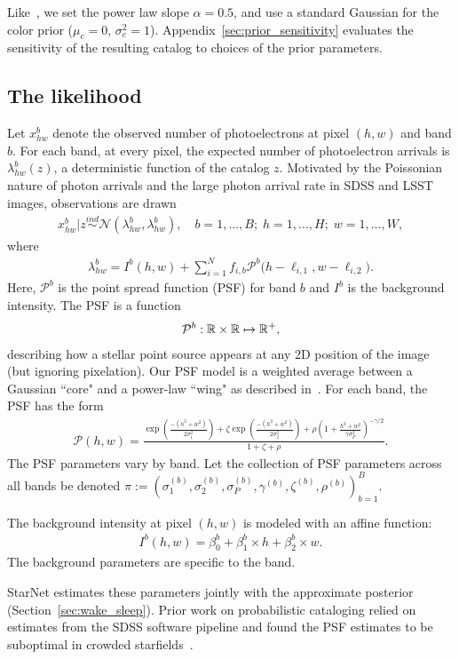 Like~\cite{Feder_2019}, we set the power law slope $\alpha = 0.5$, and use a standard Gaussian for the color prior ($\mu_c = 0$, $\sigma^2_c = 1$). 
Appendix~\ref{sec:prior_sensitivity} evaluates the 
sensitivity of the resulting catalog to choices of the prior parameters. 

\subsection{The likelihood}
Let $x_{hw}^b$ denote the observed number of photoelectrons at pixel $(h,w)$ and band $b$. For each band, at every pixel, the expected number of photoelectron arrivals is $\lambda^b_{hw}(z)$, a deterministic function of the catalog $z$. Motivated by the Poissonian nature of photon arrivals and 
the large photon arrival rate in SDSS and LSST images, 
observations are drawn
\begin{align}
  x_{hw}^b | z \overset{ind}{\sim} \mathcal{N}(\lambda^b_{hw}, \lambda^b_{hw}),
  \quad 
  b = 1, ..., B; \;
  h = 1,..., H; \; 
  w = 1, ..., W, 
\end{align}
where 
\begin{align}
  \lambda^b_{hw} = I^{b}(h, w) + \sum_{i = 1}^N f_{i,b} \mathcal{P}^b\big(h - \ell_{i, 1}, w - \ell_{i, 2}\big).
  \label{eq:expected_intensity}
\end{align}
Here, $\mathcal{P}^b$ is the point spread function (PSF) for band $b$ and $I^{b}$ is the background intensity. The PSF is a function 
\begin{align}
\mathcal{P}^b : \mathbb{R} \times \mathbb{R} \mapsto \mathbb{R}^+,
\end{align}
describing how a stellar point source appears at any 2D position of the image (but ignoring pixelation). 
Our PSF model is a weighted average between a Gaussian ``core" and a power-law ``wing" as described in~\cite{Xin2018psf}. For each band, the PSF has the form
\begin{align}
    \mathcal{P}(h, w) = \frac{\exp(\frac{-(h^2 + w^2)}{2\sigma_1^2}) + 
                            \zeta \exp(\frac{-(h^2 + w^2)}{2\sigma_2^2}) + 
                            \rho(1 + \frac{h^2 + w^2}{\gamma\sigma^2_P})^{-\gamma/2} }{1 + \zeta + \rho}.
\end{align}
The PSF parameters vary by band. Let the collection of PSF parameters across all bands be denoted $\pi := (\sigma_{1}^{(b)}, \sigma_{2}^{(b)}, \sigma_{P}^{(b)}, \gamma^{(b)}, \zeta^{(b)}, \rho^{(b)})_{b=1}^B$.

The background intensity at pixel $(h,w)$ is modeled with an affine function: 
\begin{align}
    I^{b}(h,w) = \beta_0^{b} + \beta_1^{b} \times h + \beta_2^{b} \times w.
\end{align}
The background parameters are specific to the band. 

StarNet estimates these parameters jointly with the approximate posterior (Section~\ref{sec:wake_sleep}). 
Prior work on probabilistic cataloging relied 
on estimates from the SDSS software pipeline and found the PSF estimates to be suboptimal in crowded starfields~\cite{Feder_2019}. 


